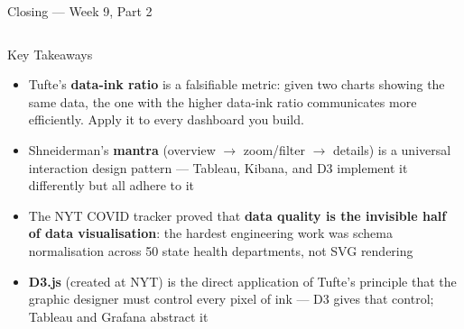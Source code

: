 \documentclass[aspectratio=169,10pt]{beamer}
\begin{document}
\begin{frame}{Closing — Week 9, Part 2}
  \begin{columns}[T]
      \begin{block}{Key Takeaways}
        \begin{itemize}
          \item Tufte's \textbf{data-ink ratio} is a falsifiable metric:
                given two charts showing the same data, the one with
                the higher data-ink ratio communicates more efficiently.
                Apply it to every dashboard you build.
          \item Shneiderman's \textbf{mantra} (overview $\to$ zoom/filter
                $\to$ details) is a universal interaction design pattern
                — Tableau, Kibana, and D3 implement it differently
                but all adhere to it
          \item The NYT COVID tracker proved that \textbf{data quality
                is the invisible half of data visualisation}:
                the hardest engineering work was schema normalisation
                across 50 state health departments, not SVG rendering
          \item \textbf{D3.js} (created at NYT) is the direct
                application of Tufte's principle that the graphic
                designer must control every pixel of ink —
                D3 gives that control; Tableau and Grafana abstract it
        \end{itemize}
      \end{block}


\end{columns}
\end{frame}
\end{document}

